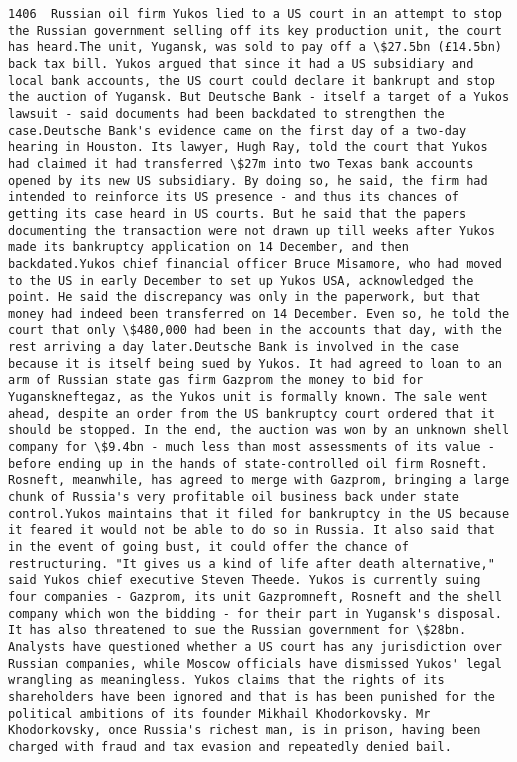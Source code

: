 \documentclass[11pt]{article}
\begin{document}
\begin{Verbatim}[commandchars=\\\{\}]
         1406  Russian oil firm Yukos lied to a US court in an attempt to stop the Russian government selling off its key production unit, the court has heard.The unit, Yugansk, was sold to pay off a \$27.5bn (£14.5bn) back tax bill. Yukos argued that since it had a US subsidiary and local bank accounts, the US court could declare it bankrupt and stop the auction of Yugansk. But Deutsche Bank - itself a target of a Yukos lawsuit - said documents had been backdated to strengthen the case.Deutsche Bank's evidence came on the first day of a two-day hearing in Houston. Its lawyer, Hugh Ray, told the court that Yukos had claimed it had transferred \$27m into two Texas bank accounts opened by its new US subsidiary. By doing so, he said, the firm had intended to reinforce its US presence - and thus its chances of getting its case heard in US courts. But he said that the papers documenting the transaction were not drawn up till weeks after Yukos made its bankruptcy application on 14 December, and then backdated.Yukos chief financial officer Bruce Misamore, who had moved to the US in early December to set up Yukos USA, acknowledged the point. He said the discrepancy was only in the paperwork, but that money had indeed been transferred on 14 December. Even so, he told the court that only \$480,000 had been in the accounts that day, with the rest arriving a day later.Deutsche Bank is involved in the case because it is itself being sued by Yukos. It had agreed to loan to an arm of Russian state gas firm Gazprom the money to bid for Yuganskneftegaz, as the Yukos unit is formally known. The sale went ahead, despite an order from the US bankruptcy court ordered that it should be stopped. In the end, the auction was won by an unknown shell company for \$9.4bn - much less than most assessments of its value - before ending up in the hands of state-controlled oil firm Rosneft. Rosneft, meanwhile, has agreed to merge with Gazprom, bringing a large chunk of Russia's very profitable oil business back under state control.Yukos maintains that it filed for bankruptcy in the US because it feared it would not be able to do so in Russia. It also said that in the event of going bust, it could offer the chance of restructuring. "It gives us a kind of life after death alternative," said Yukos chief executive Steven Theede. Yukos is currently suing four companies - Gazprom, its unit Gazpromneft, Rosneft and the shell company which won the bidding - for their part in Yugansk's disposal. It has also threatened to sue the Russian government for \$28bn. Analysts have questioned whether a US court has any jurisdiction over Russian companies, while Moscow officials have dismissed Yukos' legal wrangling as meaningless. Yukos claims that the rights of its shareholders have been ignored and that is has been punished for the political ambitions of its founder Mikhail Khodorkovsky. Mr Khodorkovsky, once Russia's richest man, is in prison, having been charged with fraud and tax evasion and repeatedly denied bail.   

\end{Verbatim}
\end{document}
